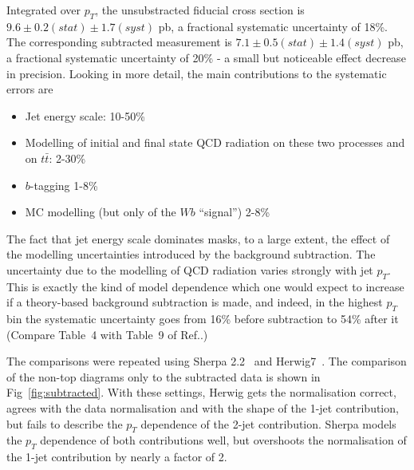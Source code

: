\documentclass[11pt]{cernrep}
\begin{document}
Integrated over $p_T$, the unsubstracted fiducial cross section is
$9.6 \pm 0.2 (stat) \pm 1.7 (syst)$ pb, a fractional systematic uncertainty of 18\%.
The corresponding subtracted measurement is 
$7.1 \pm 0.5 (stat) \pm 1.4 (syst)$ pb, a fractional systematic uncertainty of 20\%
- a small but noticeable effect decrease in precision. Looking in more detail, the main contributions 
to the systematic errors are
\begin{itemize}
\item Jet energy scale: 10-50\%
\item Modelling of initial and final state QCD radiation on these two processes and on $t\bar{t}$: 2-30\%
\item $b$-tagging 1-8\%
\item MC modelling (but only of the $Wb$ “signal”) 2-8\%
\end{itemize}
The fact that jet energy scale dominates masks, to a large extent, the effect of the modelling uncertainties introduced by
the background subtraction.
The uncertainty due to the modelling of QCD radiation varies strongly with jet $p_T$. 
This is exactly the kind of model dependence which one would expect to increase if a theory-based background
subtraction is made, and indeed, in the highest $p_T$ bin the systematic uncertainty goes from 16\% before subtraction 
to 54\% after it (Compare Table~4 with Table~9 of Ref.\cite{Aad:2013vka}.) 

The comparisons were repeated using Sherpa 2.2~\cite{} and Herwig7~\cite{}. The comparison of the non-top diagrams only to the subtracted data is shown in Fig~\ref{fig:subtracted}. 
With these settings, Herwig gets the normalisation correct, agrees with the data normalisation and with the shape of the 1-jet contribution, but fails to describe the $p_T$ 
dependence of the 2-jet contribution. Sherpa models the $p_T$ dependence of both contributions well, but overshoots the normalisation of the 1-jet contribution by nearly a 
factor of 2.
\end{document}
